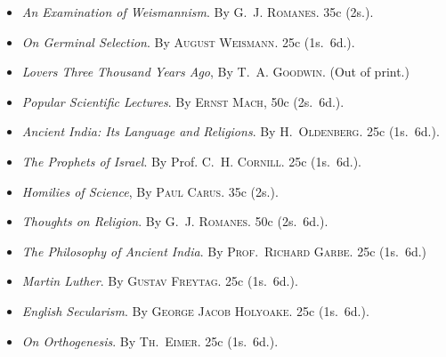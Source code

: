 \documentclass[oneside]{book}
\begin{document}
\begin{small}
\begin{itemize}
\item[]\hspace{-3ex}
\textit{An Examination of Weismannism}. By \textsc{G.~J. Romanes}. 35c (2s.).

\item[]\hspace{-3ex}
\textit{On Germinal Selection}. By \textsc{August Weismann}. 25c (1s.~6d.).

\item[]\hspace{-3ex}
\textit{Lovers Three Thousand Years Ago}, By \textsc{T.~A. Goodwin}. (Out of print.)

\item[]\hspace{-3ex}
\textit{Popular Scientific Lectures}. By \textsc{Ernst Mach}, 50c (2s.~6d.).

\item[]\hspace{-3ex}
\textit{Ancient India: Its Language and Religions}. By \textsc{H.~Oldenberg}. 25c
(1s.~6d.).

\item[]\hspace{-3ex}
\textit{The Prophets of Israel}. By Prof. \textsc{C.~H. Cornill.} 25c (1s.~6d.).

\item[]\hspace{-3ex}
\textit{Homilies of Science}, By \textsc{Paul Carus}. 35c (2s.).

\item[]\hspace{-3ex}
\textit{Thoughts on Religion}. By \textsc{G.~J. Romanes}. 50c (2s.~6d.).

\item[]\hspace{-3ex}
\textit{The Philosophy of Ancient India}. By \textsc{Prof.\ Richard Garbe}. 25c (1s.~6d.)

\item[]\hspace{-3ex}
\textit{Martin Luther}. By \textsc{Gustav Freytag}. 25c (1s.~6d.).

\item[]\hspace{-3ex}
\textit{English Secularism}. By \textsc{George Jacob Holyoake}. 25c (1s.~6d.).

\item[]\hspace{-3ex}
\textit{On Orthogenesis}. By \textsc{Th.~Eimer}. 25c (1s.~6d.).


\end{itemize}
\end{small}
\end{document}
